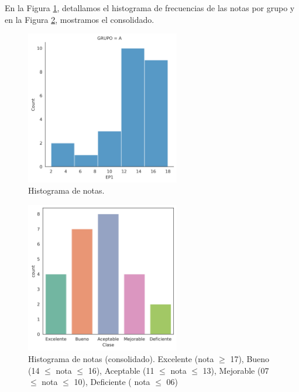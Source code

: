     \begin{flushleft}
    En la Figura \ref{fig:hist_EP1}, detallamos el histograma de frecuencias de las
    notas por grupo y en la Figura \ref{fig:hist_all_EP1}, mostramos el consolidado. 
    \end{flushleft}

    \begin{figure}[H]	
    \centering 		
				\includegraphics[width=0.6\textwidth]{../imgs/hist_EP1.png}
                \caption{Histograma de notas.}
                \label{fig:hist_EP1}
	\end{figure}

    \begin{figure}[H]	
    \centering 		
				\includegraphics[width=0.6\textwidth]{../imgs/hist_all_EP1.png}
                \caption{Histograma de notas (consolidado). Excelente (nota $\geq$ 17), Bueno (14 $\leq$ nota $\leq$ 16), Aceptable (11 $\leq$ nota $\leq$ 13), Mejorable (07 $\leq$ nota $\leq$ 10), Deficiente ( nota $\leq$ 06)}
                \label{fig:hist_all_EP1}
	\end{figure}
      


